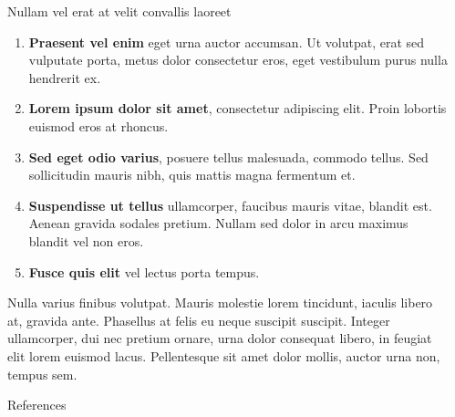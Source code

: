 \documentclass[final]{beamer}
\newlength{\sepwidth}
\newlength{\colwidth}
\newcommand{\separatorcolumn}{\begin{column}{\sepwidth}\end{column}}
\begin{document}
\begin{frame}[t]
\begin{columns}[t]
\begin{column}{\colwidth}
\begin{block}{Nullam vel erat at velit convallis laoreet}
    \begin{enumerate}
      \item \textbf{Praesent vel enim} eget urna auctor accumsan. Ut volutpat, erat sed vulputate porta, metus dolor consectetur eros, eget vestibulum purus nulla hendrerit ex.
      \item \textbf{Lorem ipsum dolor sit amet}, consectetur adipiscing elit. Proin lobortis euismod eros at rhoncus.
      \item \textbf{Sed eget odio varius}, posuere tellus malesuada, commodo tellus. Sed sollicitudin mauris nibh, quis mattis magna fermentum et.
      \item \textbf{Suspendisse ut tellus} ullamcorper, faucibus mauris vitae, blandit est. Aenean gravida sodales pretium. Nullam sed dolor in arcu maximus blandit vel non eros.
      \item \textbf{Fusce quis elit} vel lectus porta tempus.
    \end{enumerate}

    Nulla varius finibus volutpat. Mauris molestie lorem tincidunt, iaculis
    libero at, gravida ante. Phasellus at felis eu neque suscipit suscipit.
    Integer ullamcorper, dui nec pretium ornare, urna dolor consequat libero,
    in feugiat elit lorem euismod lacus. Pellentesque sit amet dolor mollis,
    auctor urna non, tempus sem.

  \end{block}

  \begin{block}{References}

    \nocite{*}
    \footnotesize{}

  \end{block}

\end{column}

\separatorcolumn
\end{columns}
\end{frame}
\end{document}
